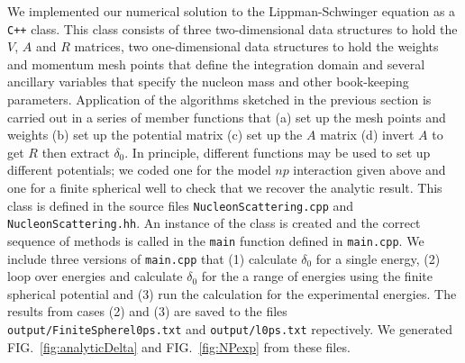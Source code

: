 \documentclass[10pt,showpacs,preprintnumbers,footinbib,amsmath,amssymb,aps,prl,twocolumn,groupedaddress,superscriptaddress,showkeys]{revtex4-1}
\begin{document}
We implemented our numerical solution to the Lippman-Schwinger equation as a \texttt{C++} class.
This class consists of three two-dimensional data structures to hold the $V$, $A$ and $R$ matrices,
two one-dimensional data structures to hold the weights and momentum mesh points that define the
integration domain and several ancillary variables that specify the nucleon mass and other book-keeping
parameters. Application of the algorithms sketched in the previous section is carried out in a series of
member functions that (a) set up the mesh points and weights (b) set up the potential matrix (c) set
up the $A$ matrix (d) invert $A$ to get $R$ then extract $\delta _0$. In principle,
different functions may be used to set up different potentials; we coded one for the model $np$ interaction
given above and one for a finite spherical well to check that we recover the analytic result.
This class is defined in the source
files \texttt{NucleonScattering.cpp} and \texttt{NucleonScattering.hh}. An instance of the class is
created and the correct sequence of methods is called in the \texttt{main} function defined in
\texttt{main.cpp}. We include three versions of \texttt{main.cpp} that (1) calculate $\delta_0$
for a single energy, (2) loop over energies and calculate $\delta_0$ for the a range of energies
using the finite spherical potential and (3) run the calculation for the experimental energies.
The results from cases (2) and (3) are saved to the files \texttt{output/FiniteSpherel0ps.txt}
and \texttt{output/l0ps.txt} repectively. We generated FIG.~\ref{fig:analyticDelta} and
FIG.~\ref{fig:NPexp} from these files.



\end{document}
